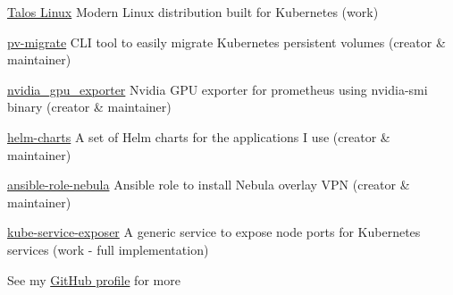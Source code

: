 
\begin{cvskills}

    \cvskill
    {\href{https://github.com/siderolabs/talos/commits?author=utkuozdemir}{Talos Linux}}
    {Modern Linux distribution built for Kubernetes (work)}

    \cvskill
    {\href{https://github.com/utkuozdemir/pv-migrate}{pv-migrate}}
    {CLI tool to easily migrate Kubernetes persistent volumes (creator \& maintainer)}

    \cvskill
    {\href{https://github.com/utkuozdemir/nvidia_gpu_exporter}{nvidia\_gpu\_exporter}}
    {Nvidia GPU exporter for prometheus using nvidia-smi binary (creator \& maintainer)}

    \cvskill
    {\href{https://github.com/utkuozdemir/helm-charts}{helm-charts}}
    {A set of Helm charts for the applications I use (creator \& maintainer)}

    \cvskill
    {\href{https://github.com/utkuozdemir/ansible-role-nebula}{ansible-role-nebula}}
    {Ansible role to install Nebula overlay VPN (creator \& maintainer)}

    \cvskill
    {\href{https://github.com/siderolabs/kube-service-exposer}{kube-service-exposer}}
    {A generic service to expose node ports for Kubernetes services (work - full implementation)}

    \cvskill
    {}
    {See my \href{https://github.com/utkuozdemir}{GitHub profile} for more}

\end{cvskills}
